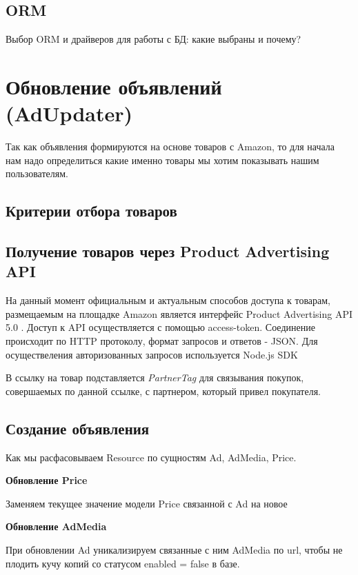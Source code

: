 \documentclass[times]{itmo-student-thesis}
\begin{document}
\subsection{ORM}

Выбор ORM и драйверов для работы с БД: какие выбраны и почему?



\section{Обновление объявлений (AdUpdater)}

Так как объявления формируются на основе товаров с Amazon, то для начала нам надо определиться какие именно товары мы хотим показывать нашим пользователям.

\subsection{Критерии отбора товаров}

\subsection{Получение товаров через Product Advertising API}

На данный момент официальным и актуальным способов доступа к товарам, размещаемым на площадке Amazon является интерфейс Product Advertising API 5.0 \cite{amazon-paapi-docs}. Доступ к API осуществляется с помощью access-token. Соединение происходит по HTTP протоколу, формат запросов и ответов - JSON. Для осуществеления авторизованных запросов используется Node.js SDK \cite{amazon-paapi-sdk}

В ссылку на товар подставляется \textit{PartnerTag} для связывания покупок, совершаемых по данной ссылке, с партнером, который привел покупателя.

\subsection{Создание объявления}

Как мы расфасовываем Resource по сущностям Ad, AdMedia, Price.

\textbf{Обновление Price}

Заменяем текущее значение модели Price связанной с Ad на новое

\textbf{Обновление AdMedia}

При обновлении Ad уникализируем связанные с ним AdMedia по url, чтобы не плодить кучу копий со статусом enabled = false в базе.
\end{document}

